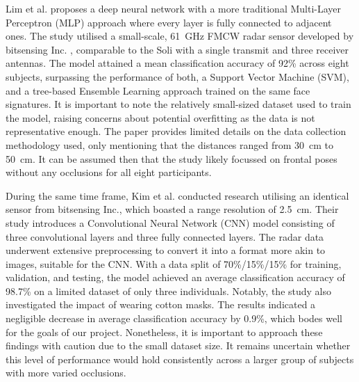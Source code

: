 \documentclass{mpaper}
\begin{document}
Lim et al. \cite{lim2020dnn} proposes a deep neural network with a more traditional Multi-Layer Perceptron (MLP) approach where every layer is fully connected to adjacent ones. The study utilised a small-scale, \qty{61}{\GHz} FMCW radar sensor developed by bitsensing Inc. \cite{bitsensing2020bts60}, comparable to the Soli with a single transmit and three receiver antennas. The model attained a mean classification accuracy of 92\% across eight subjects, surpassing the performance of both, a Support Vector Machine (SVM), and a tree-based Ensemble Learning approach trained on the same face signatures. It is important to note the relatively small-sized dataset used to train the model, raising concerns about potential overfitting as the data is not representative enough. The paper provides limited details on the data collection methodology used, only mentioning that the distances ranged from \qty{30}{\cm} to \qty{50}{\cm}. It can be assumed then that the study likely focussed on frontal poses without any occlusions for all eight participants. 

During the same time frame, Kim et al. \cite{kim2020face} conducted research utilising an identical sensor from bitsensing Inc., which boasted a range resolution of \qty{2.5}{\cm}. Their study introduces a Convolutional Neural Network (CNN) model consisting of three convolutional layers and three fully connected layers. The radar data underwent extensive preprocessing to convert it into a format more akin to images, suitable for the CNN. With a data split of 70\%/15\%/15\% for training, validation, and testing, the model achieved an average classification accuracy of 98.7\% on a limited dataset of only three individuals. Notably, the study also investigated the impact of wearing cotton masks. The results indicated a negligible decrease in average classification accuracy by 0.9\%, which bodes well for the goals of our project. Nonetheless, it is important to approach these findings with caution due to the small dataset size. It remains uncertain whether this level of performance would hold consistently across a larger group of subjects with more varied occlusions.
\end{document}
